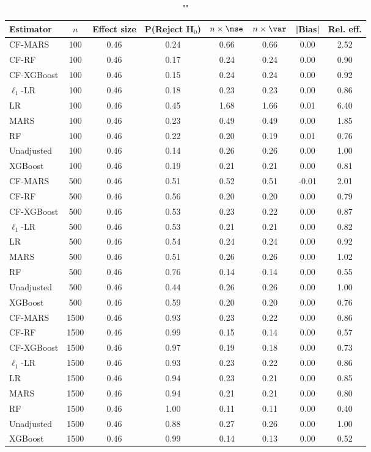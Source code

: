 \begin{table}
\centering
\caption{""}
\begin{tabular}{lccccccc}
\toprule
Estimator & $n$ & Effect size & P(Reject H$_0$) & $n\times\mse$ & $n\times \var$ & |Bias| & Rel. eff.\\ \midrule
CF-MARS & 100 & 0.46 & 0.24 & 0.66 & 0.66 &  0.00 & 2.52 \\ 
CF-RF & 100 & 0.46 & 0.17 & 0.24 & 0.24 &  0.00 & 0.90 \\ 
CF-XGBoost & 100 & 0.46 & 0.15 & 0.24 & 0.24 &  0.00 & 0.92 \\ 
$\ell_1$-LR & 100 & 0.46 & 0.18 & 0.23 & 0.23 &  0.00 & 0.86 \\ 
LR & 100 & 0.46 & 0.45 & 1.68 & 1.66 &  0.01 & 6.40 \\ 
MARS & 100 & 0.46 & 0.23 & 0.49 & 0.49 &  0.00 & 1.85 \\ 
RF & 100 & 0.46 & 0.22 & 0.20 & 0.19 &  0.01 & 0.76 \\ 
Unadjusted & 100 & 0.46 & 0.14 & 0.26 & 0.26 &  0.00 & 1.00 \\ 
XGBoost & 100 & 0.46 & 0.19 & 0.21 & 0.21 &  0.00 & 0.81 \\ \addlinespace 
CF-MARS & 500 & 0.46 & 0.51 & 0.52 & 0.51 & -0.01 & 2.01 \\ 
CF-RF & 500 & 0.46 & 0.56 & 0.20 & 0.20 &  0.00 & 0.79 \\ 
CF-XGBoost & 500 & 0.46 & 0.53 & 0.23 & 0.22 &  0.00 & 0.87 \\ 
$\ell_1$-LR & 500 & 0.46 & 0.53 & 0.21 & 0.21 &  0.00 & 0.82 \\ 
LR & 500 & 0.46 & 0.54 & 0.24 & 0.24 &  0.00 & 0.92 \\ 
MARS & 500 & 0.46 & 0.51 & 0.26 & 0.26 &  0.00 & 1.02 \\ 
RF & 500 & 0.46 & 0.76 & 0.14 & 0.14 &  0.00 & 0.55 \\ 
Unadjusted & 500 & 0.46 & 0.44 & 0.26 & 0.26 &  0.00 & 1.00 \\ 
XGBoost & 500 & 0.46 & 0.59 & 0.20 & 0.20 &  0.00 & 0.76 \\ \addlinespace 
CF-MARS & 1500 & 0.46 & 0.93 & 0.23 & 0.22 &  0.00 & 0.86 \\ 
CF-RF & 1500 & 0.46 & 0.99 & 0.15 & 0.14 &  0.00 & 0.57 \\ 
CF-XGBoost & 1500 & 0.46 & 0.97 & 0.19 & 0.18 &  0.00 & 0.73 \\ 
$\ell_1$-LR & 1500 & 0.46 & 0.93 & 0.23 & 0.22 &  0.00 & 0.86 \\ 
LR & 1500 & 0.46 & 0.94 & 0.23 & 0.21 &  0.00 & 0.85 \\ 
MARS & 1500 & 0.46 & 0.94 & 0.21 & 0.21 &  0.00 & 0.80 \\ 
RF & 1500 & 0.46 & 1.00 & 0.11 & 0.11 &  0.00 & 0.40 \\ 
Unadjusted & 1500 & 0.46 & 0.88 & 0.27 & 0.26 &  0.00 & 1.00 \\ 
XGBoost & 1500 & 0.46 & 0.99 & 0.14 & 0.13 &  0.00 & 0.52 \\
\bottomrule
\end{tabular}
\end{table}

